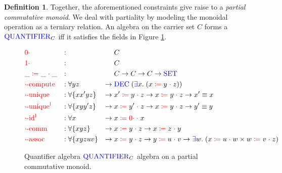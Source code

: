 \documentclass[a4paper,UKenglish,cleveref, autoref, thm-restate,authorcolumns]{lipics-v2019}
\theoremstyle{definition}
\newtheorem{nidefinition}[theorem]{Definition}
\newcommand{\type}[1]{\textcolor{blue}{\mathtt{\operatorname{#1}}}}
\newcommand{\field}[1]{\textcolor{red}{\mathtt{\operatorname{#1}}}}
\newcommand{\op}[3]{#1 \; \field{\coloneqq} \; #2 \; \field{\cdot} \; #3}
\newcommand{\zero}{\field{0\cdot}}
\newcommand{\one}{\field{1\cdot}}
\newcommand{\Set}{\type{SET}}
\newcommand{\Quantifier}{\type{QUANTIFIER}}
\begin{document}
\begin{nidefinition}
  Together, the aforementioned constraints give raise to a \emph{partial commutative monoid}.
  We deal with partiality by modeling the monoidal operation as a terniary relation.
  An algebra on the carrier set $C$ forms a $\Quantifier_C$ iff it satisfies the fields in Figure \ref{fig:multiplicities}.
  
  \begin{figure}[h]
  \begin{equation}
  \begin{aligned}
    &\zero                  &:{} &                      &        & C \\
    &\one                   &:{} &                      &        & C \\
    &\op{\_}{\_}{\_}        &:{} &                      &        & C \to C \to C \to \Set \\
    &\field{\cdot-compute}  &:{} &\forall y z           & \to \; & \type{DEC} \; (\type{\exists} x . \; (\op{x}{y}{z})) \\
    &\field{\cdot-unique}   &:{} &\forall \{x x' y z\}  & \to \; & \op{x'}{y}{z} \to \op{x}{y}{z} \to x' \equiv x \\
    &\field{\cdot-unique^l} &:{} &\forall \{x y y' z\}  & \to \; & \op{x}{y'}{z} \to \op{x}{y}{z} \to y' \equiv y \\
    &\field{\cdot-id^l}     &:{} &\forall x             & \to \; & \op{x}{\zero}{x} \\
    &\field{\cdot-comm}     &:{} &\forall \{x y z\}     & \to \; & \op{x}{y}{z} \to \op{x}{z}{y} \\
    &\field{\cdot-assoc}    &:{} &\forall \{x y z u v\} & \to \; & \op{x}{y}{z} \to \op{y}{u}{v} \to \type{\exists} w . \; (\op{x}{u}{w} \times \op{w}{v}{z})
  \end{aligned}
  \end{equation}
  \caption{Quantifier algebra $\Quantifier_C$ algebra on a partial commutative monoid.}
  \label{fig:multiplicities}
  \end{figure}
\end{nidefinition}
\end{document}
